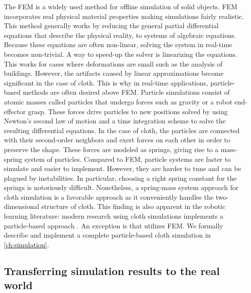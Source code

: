 \documentclass[\home/main.tex]{subfiles}
\begin{document}
The \gls{FEM} is a widely used method for offline simulation of solid objects. \Gls{FEM} incorporates real physical material properties making simulations fairly realistic. This method generally works by reducing the general partial differential equations that describe the physical reality, to systems of algebraic equations. Because these equations are often non-linear, solving the system in real-time becomes non-trivial. A way to speed-up the solver is linearizing the equations. This works for cases where deformations are small such as the analysis of buildings. However, the artifacts caused by linear approximations become significant in the case of cloth. This is why in real-time applications, particle-based methods are often desired above \gls{FEM}. Particle simulations consist of atomic masses called particles that undergo forces such as gravity or a robot end-effector grasp. These forces drive particles to new positions solved by using Newton's second law of motion and a time integration scheme to solve the resulting differential equations. In the case of cloth, the particles are connected with their second-order neighbors and exert forces on each other in order to preserve the shape. These forces are modeled as springs, giving rise to a mass-spring system of particles. Compared to \gls{FEM}, particle systems are faster to simulate and easier to implement. However, they are harder to tune and can be plagued by instabilities. In particular, choosing a right spring constant for the springs is notoriously difficult. Nonetheless, a spring-mass system approach for cloth simulation is a favorable approach as it conveniently handles the two-dimensional structure of cloth. This finding is also apparent in the robotic learning literature: modern research using cloth simulations implements a particle-based approach \autocite{Matas2018,seita2021learning,dedo,softgym}. An exception is \autocite{liang2019differentiable} that utilizes \gls{FEM}. We formally describe and implement a complete particle-based cloth simulation in \cref{ch:simulation}.

\subsection{Transferring simulation results to the real world}  \label{sec:lit_sim2real}

\end{document}
